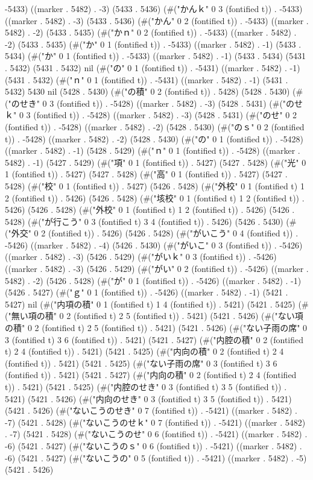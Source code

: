 -5433) ((marker . 5482) . -3) (5433 . 5436) (#("かんｋ" 0 3 (fontified t)) . -5433) ((marker . 5482) . -3) (5433 . 5436) (#("かん" 0 2 (fontified t)) . -5433) ((marker . 5482) . -2) (5433 . 5435) (#("かｎ" 0 2 (fontified t)) . -5433) ((marker . 5482) . -2) (5433 . 5435) (#("か" 0 1 (fontified t)) . -5433) ((marker . 5482) . -1) (5433 . 5434) (#("か" 0 1 (fontified t)) . -5433) ((marker . 5482) . -1) (5433 . 5434) (5431 . 5432) (5431 . 5432) nil (#("の" 0 1 (fontified t)) . -5431) ((marker . 5482) . -1) (5431 . 5432) (#("ｎ" 0 1 (fontified t)) . -5431) ((marker . 5482) . -1) (5431 . 5432) 5430 nil (5428 . 5430) (#("の積" 0 2 (fontified t)) . 5428) (5428 . 5430) (#("のせき" 0 3 (fontified t)) . -5428) ((marker . 5482) . -3) (5428 . 5431) (#("のせｋ" 0 3 (fontified t)) . -5428) ((marker . 5482) . -3) (5428 . 5431) (#("のせ" 0 2 (fontified t)) . -5428) ((marker . 5482) . -2) (5428 . 5430) (#("のｓ" 0 2 (fontified t)) . -5428) ((marker . 5482) . -2) (5428 . 5430) (#("の" 0 1 (fontified t)) . -5428) ((marker . 5482) . -1) (5428 . 5429) (#("ｎ" 0 1 (fontified t)) . -5428) ((marker . 5482) . -1) (5427 . 5429) (#("項" 0 1 (fontified t)) . 5427) (5427 . 5428) (#("光" 0 1 (fontified t)) . 5427) (5427 . 5428) (#("高" 0 1 (fontified t)) . 5427) (5427 . 5428) (#("校" 0 1 (fontified t)) . 5427) (5426 . 5428) (#("外校" 0 1 (fontified t) 1 2 (fontified t)) . 5426) (5426 . 5428) (#("垓校" 0 1 (fontified t) 1 2 (fontified t)) . 5426) (5426 . 5428) (#("外校" 0 1 (fontified t) 1 2 (fontified t)) . 5426) (5426 . 5428) (#("が行こう" 0 3 (fontified t) 3 4 (fontified t)) . 5426) (5426 . 5430) (#("外交" 0 2 (fontified t)) . 5426) (5426 . 5428) (#("がいこう" 0 4 (fontified t)) . -5426) ((marker . 5482) . -4) (5426 . 5430) (#("がいこ" 0 3 (fontified t)) . -5426) ((marker . 5482) . -3) (5426 . 5429) (#("がいｋ" 0 3 (fontified t)) . -5426) ((marker . 5482) . -3) (5426 . 5429) (#("がい" 0 2 (fontified t)) . -5426) ((marker . 5482) . -2) (5426 . 5428) (#("が" 0 1 (fontified t)) . -5426) ((marker . 5482) . -1) (5426 . 5427) (#("ｇ" 0 1 (fontified t)) . -5426) ((marker . 5482) . -1) (5421 . 5427) nil (#("内項の積" 0 1 (fontified t) 1 4 (fontified t)) . 5421) (5421 . 5425) (#("無い項の積" 0 2 (fontified t) 2 5 (fontified t)) . 5421) (5421 . 5426) (#("ない項の積" 0 2 (fontified t) 2 5 (fontified t)) . 5421) (5421 . 5426) (#("ない子雨の席" 0 3 (fontified t) 3 6 (fontified t)) . 5421) (5421 . 5427) (#("内腔の積" 0 2 (fontified t) 2 4 (fontified t)) . 5421) (5421 . 5425) (#("内向の積" 0 2 (fontified t) 2 4 (fontified t)) . 5421) (5421 . 5425) (#("ない子雨の席" 0 3 (fontified t) 3 6 (fontified t)) . 5421) (5421 . 5427) (#("内向の積" 0 2 (fontified t) 2 4 (fontified t)) . 5421) (5421 . 5425) (#("内腔のせき" 0 3 (fontified t) 3 5 (fontified t)) . 5421) (5421 . 5426) (#("内向のせき" 0 3 (fontified t) 3 5 (fontified t)) . 5421) (5421 . 5426) (#("ないこうのせき" 0 7 (fontified t)) . -5421) ((marker . 5482) . -7) (5421 . 5428) (#("ないこうのせｋ" 0 7 (fontified t)) . -5421) ((marker . 5482) . -7) (5421 . 5428) (#("ないこうのせ" 0 6 (fontified t)) . -5421) ((marker . 5482) . -6) (5421 . 5427) (#("ないこうのｓ" 0 6 (fontified t)) . -5421) ((marker . 5482) . -6) (5421 . 5427) (#("ないこうの" 0 5 (fontified t)) . -5421) ((marker . 5482) . -5) (5421 . 5426) 